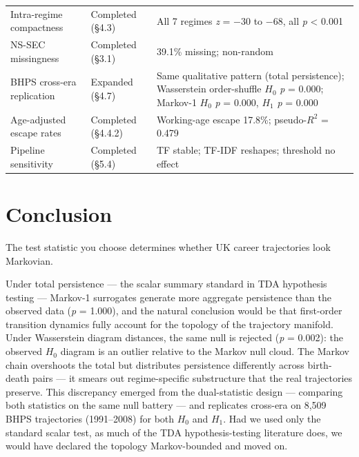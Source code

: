 \begin{table}[htbp]
{\begin{tabular}{p{3.5cm}p{3cm}p{7cm}}
Intra-regime compactness & Completed (\S4.3) & All 7 regimes \textit{z} = $-$30 to $-$68, all \textit{p} < 0.001 \\
NS-SEC missingness & Completed (\S3.1) & 39.1\% missing; non-random \\
BHPS cross-era replication & Expanded (\S4.7) & Same qualitative pattern (total persistence); Wasserstein order-shuffle $H_0$ \textit{p} = 0.000; Markov-1 $H_0$ \textit{p} = 0.000, $H_1$ \textit{p} = 0.000 \\
Age-adjusted escape rates & Completed (\S4.4.2) & Working-age escape 17.8\%; pseudo-$R^2$ = 0.479 \\
Pipeline sensitivity & Completed (\S5.4) & TF stable; TF-IDF reshapes; threshold no effect \\
\bottomrule
\end{tabular}%
}
\end{table}


\section{Conclusion}

The test statistic you choose determines whether UK career trajectories look Markovian.

Under total persistence --- the scalar summary standard in TDA hypothesis testing --- Markov-1 surrogates generate more aggregate persistence than the observed data (\textit{p} = 1.000), and the natural conclusion would be that first-order transition dynamics fully account for the topology of the trajectory manifold. Under Wasserstein diagram distances, the same null is rejected (\textit{p} = 0.002): the observed $H_0$ diagram is an outlier relative to the Markov null cloud. The Markov chain overshoots the total but distributes persistence differently across birth-death pairs --- it smears out regime-specific substructure that the real trajectories preserve. This discrepancy emerged from the dual-statistic design --- comparing both statistics on the same null battery --- and replicates cross-era on 8,509 BHPS trajectories (1991--2008) for both $H_0$ and $H_1$. Had we used only the standard scalar test, as much of the TDA hypothesis-testing literature does, we would have declared the topology Markov-bounded and moved on.

